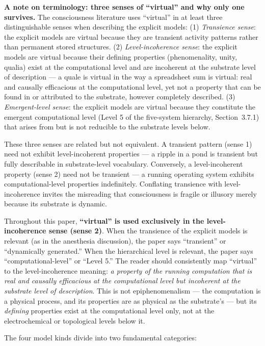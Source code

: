 \documentclass[12pt]{article}
\newcommand{\revstart}{}
\newcommand{\revend}{}
\begin{document}
{\revstart\textbf{A note on terminology: three senses of ``virtual'' and why only one survives.} The consciousness literature uses ``virtual'' in at least three distinguishable senses when describing the explicit models: (1) \emph{Transience sense}: the explicit models are virtual because they are transient activity patterns rather than permanent stored structures. (2) \emph{Level-incoherence sense}: the explicit models are virtual because their defining properties (phenomenality, unity, qualia) exist at the computational level and are incoherent at the substrate level of description --- a quale is virtual in the way a spreadsheet sum is virtual: real and causally efficacious at the computational level, yet not a property that can be found in or attributed to the substrate, however completely described. (3) \emph{Emergent-level sense}: the explicit models are virtual because they constitute the emergent computational level (Level 5 of the five-system hierarchy, Section~3.7.1) that arises from but is not reducible to the substrate levels below.

These three senses are related but not equivalent. A transient pattern (sense 1) need not exhibit level-incoherent properties --- a ripple in a pond is transient but fully describable in substrate-level vocabulary. Conversely, a level-incoherent property (sense 2) need not be transient --- a running operating system exhibits computational-level properties indefinitely. Conflating transience with level-incoherence invites the misreading that consciousness is fragile or illusory merely because its substrate is dynamic.

Throughout this paper, \textbf{``virtual'' is used exclusively in the level-incoherence sense (sense 2)}. When the transience of the explicit models is relevant (as in the anesthesia discussion), the paper says ``transient'' or ``dynamically generated.'' When the hierarchical level is relevant, the paper says ``computational-level'' or ``Level 5.'' The reader should consistently map ``virtual'' to the level-incoherence meaning: \emph{a property of the running computation that is real and causally efficacious at the computational level but incoherent at the substrate level of description}. This is not epiphenomenalism --- the computation is a physical process, and its properties are as physical as the substrate's --- but its \emph{defining} properties exist at the computational level only, not at the electrochemical or topological levels below it.\revend}

The four model kinds divide into two fundamental categories:
\end{document}
